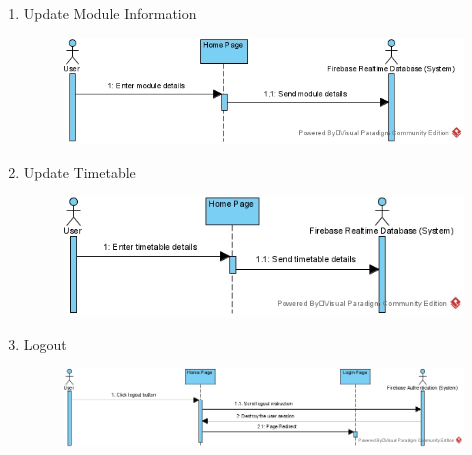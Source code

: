 \documentclass[../report.tex]{subfiles}
\begin{document}
\begin{enumerate}
\begin{figure}[H]
\label{fig:web-lec-seq}
\end{figure}
\item Update Module Information\\
\begin{figure}[H]
\centering
\includegraphics[width=\textwidth]{./images/05-07-web-module.png}
\label{fig:web-module-seq}
\end{figure}
\item Update Timetable\\
\begin{figure}[H]
\centering
\includegraphics[width=\textwidth]{./images/05-07-web-timetable.png}
\label{fig:web-timetable-seq}
\end{figure}
\item Logout\\
\begin{figure}[H]
\centering
\includegraphics[width=\textwidth]{./images/05-07-web-logout.png}
\label{fig:web-logout-seq}
\end{figure}
\end{enumerate}
\end{document}
